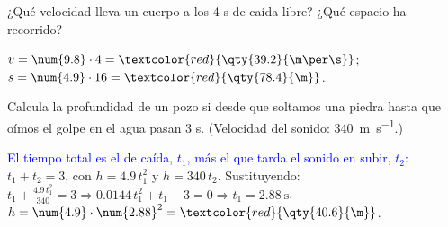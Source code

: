 \begin{exercise}
    ¿Qué velocidad lleva un cuerpo a los 4 s de caída libre? ¿Qué espacio ha recorrido?
    \begin{solu}
        \(v = \num{9.8} \cdot 4 = \textcolor{red}{\qty{39.2}{\m\per\s}}\); \(s = \num{4.9} \cdot 16 = \textcolor{red}{\qty{78.4}{\m}}\).
    \end{solu}
\end{exercise}

\begin{exercise}
    Calcula la profundidad de un pozo si desde que soltamos una piedra hasta que oímos el golpe en el agua pasan 3 s. (Velocidad del sonido: \qty{340}{\m\per\s}.)
    \begin{solu}
        \textcolor{blue}{El tiempo total es el de caída, \(t_1\), más el que tarda el sonido en subir, \(t_2\):} \(t_1 + t_2 = 3\), con \(h = \num{4.9}\,t_1^2\) y \(h = 340\,t_2\).
        Sustituyendo: \(t_1 + \frac{\num{4.9}\,t_1^2}{340} = 3 \Rightarrow \num{0.0144}\,t_1^2 + t_1 - 3 = 0 \Rightarrow t_1 = \qty{2.88}{\s}\).
        \(h = \num{4.9} \cdot \num{2.88}^2 = \textcolor{red}{\qty{40.6}{\m}}\).
    \end{solu}
\end{exercise}

